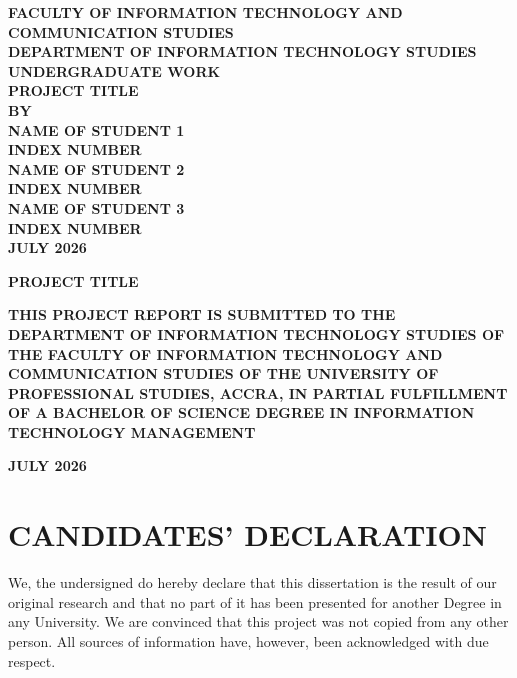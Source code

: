 \documentclass[12pt,twoside]{report}
\begin{document}
\thispagestyle{empty}
\begin{center}
\vspace*{2cm}
\textbf{\Large FACULTY OF INFORMATION TECHNOLOGY AND COMMUNICATION STUDIES}\\[1cm]
\textbf{\Large DEPARTMENT OF INFORMATION TECHNOLOGY STUDIES}\\[1cm]
\textbf{\Large UNDERGRADUATE WORK}\\[3cm]
\textbf{\LARGE PROJECT TITLE}\\[4cm]
\textbf{\large BY}\\[2cm]
\textbf{\large NAME OF STUDENT 1\\INDEX NUMBER}\\[0.5cm]
\textbf{\large NAME OF STUDENT 2\\INDEX NUMBER}\\[0.5cm]
\textbf{\large NAME OF STUDENT 3\\INDEX NUMBER}\\[2cm]
\textbf{\large JULY 2026}
\end{center}
\newpage

\thispagestyle{empty}
\phantom{}
\newpage

\thispagestyle{empty}
\begin{center}
\vspace*{2cm}
\textbf{\LARGE PROJECT TITLE}\\[3cm]
\end{center}
\begin{flushright}
\begin{minipage}{0.8\textwidth}
\textbf{\large THIS PROJECT REPORT IS SUBMITTED TO THE DEPARTMENT OF INFORMATION TECHNOLOGY STUDIES OF THE FACULTY OF INFORMATION TECHNOLOGY AND COMMUNICATION STUDIES OF THE UNIVERSITY OF PROFESSIONAL STUDIES, ACCRA, IN PARTIAL FULFILLMENT OF A BACHELOR OF SCIENCE DEGREE IN INFORMATION TECHNOLOGY MANAGEMENT}\\[2cm]
\end{minipage}
\end{flushright}
\begin{center}
\textbf{\large JULY 2026}
\end{center}
\newpage

\chapter*{CANDIDATES' DECLARATION}
\vspace{2cm}
\noindent We, the undersigned do hereby declare that this dissertation is the result of our original research and that no part of it has been presented for another Degree in any University. We are convinced that this project was not copied from any other person. All sources of information have, however, been acknowledged with due respect.
\end{document}
